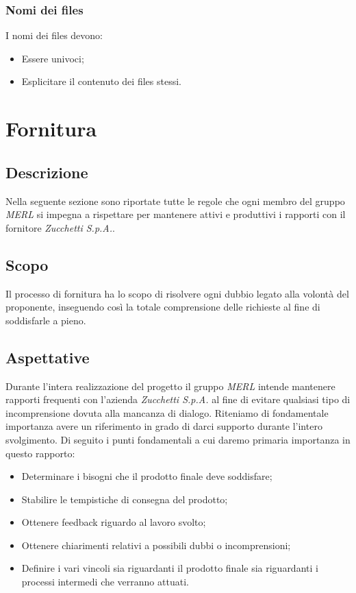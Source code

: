   \subsubsection{Nomi dei files}
  I nomi dei files devono:
  \begin{itemize}
    \item Essere univoci;
    \item Esplicitare il contenuto dei files stessi.
  \end{itemize}
  
 \section{Fornitura}
\subsection{Descrizione}
Nella seguente sezione sono riportate tutte le regole che ogni membro del gruppo \textit{MERL} si impegna a rispettare per mantenere attivi e produttivi i rapporti con il fornitore \textit{Zucchetti S.p.A.}.

\subsection{Scopo}
Il processo di fornitura ha lo scopo di risolvere ogni dubbio legato alla volontà del proponente, inseguendo così la totale comprensione delle richieste al fine di soddisfarle a pieno.

\subsection{Aspettative}
Durante l'intera realizzazione del progetto il gruppo \textit{MERL} intende mantenere rapporti frequenti con l'azienda \textit{Zucchetti S.p.A.} al fine di evitare qualsiasi tipo di incomprensione dovuta alla mancanza di dialogo. Riteniamo di fondamentale importanza avere un riferimento in grado di darci supporto durante l'intero svolgimento. Di seguito i punti fondamentali a cui daremo primaria importanza in questo rapporto:
\begin{itemize}
  \item Determinare i bisogni che il prodotto finale deve soddisfare;
  \item Stabilire le tempistiche di consegna del prodotto;
  \item Ottenere feedback riguardo al lavoro svolto;
  \item Ottenere chiarimenti relativi a possibili dubbi o incomprensioni;
  \item Definire i vari vincoli sia riguardanti il prodotto finale sia riguardanti i processi intermedi che verranno attuati.
\end{itemize}

